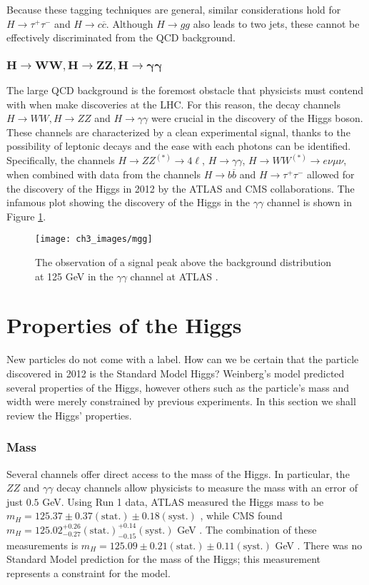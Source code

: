 \documentclass[10pt,a4paper]{book}
\begin{document}
Because these tagging techniques are general, similar considerations hold for $H \rightarrow \tau^+ \tau^-$ and $H \rightarrow c \overline{c}$. Although $H \rightarrow g g$ also leads to two jets, these cannot be effectively discriminated from the QCD background.

\subsubsection{$\mathbf{H\rightarrow WW, H\rightarrow ZZ, H\rightarrow \gamma\gamma}$}
The large QCD background is the foremost obstacle that physicists must contend with when make discoveries at the LHC. For this reason, the decay channels  
$H\rightarrow WW, H\rightarrow ZZ$ and $H\rightarrow \gamma\gamma$ were crucial in the discovery of the Higgs boson. These channels are characterized by a clean experimental signal, thanks to the possibility of leptonic decays and the ease with each photons can be identified. Specifically, the channels $H\rightarrow ZZ^{(*)}\rightarrow 4\ell$, $H\rightarrow\gamma\gamma$, $H\rightarrow WW^{(*)} \rightarrow e\nu\mu\nu$, when combined with data from the channels $H\rightarrow b\overline{b}$ and $H \rightarrow \tau^+ \tau^-$ allowed for the discovery of the Higgs in 2012 by the ATLAS and CMS collaborations. The infamous plot showing the discovery of the Higgs in the $\gamma\gamma$ channel is shown in Figure \ref{mgg}.

\begin{figure}
\centering
\texttt{[image: ch3\_images/mgg]}
\caption{The observation of a signal peak above the background distribution at 125 GeV in the $\gamma\gamma$ channel at ATLAS \cite{ATLAS:2012yve}.}
\label{mgg}
\end{figure}

\section{Properties of the Higgs}
New particles do not come with a label. How can we be certain that the particle discovered in 2012 is the Standard Model Higgs? Weinberg's model predicted several properties of the Higgs, however others such as the particle's mass and width were merely constrained by previous experiments. In this section we shall review the Higgs' properties.

\subsubsection{Mass}
Several channels offer direct access to the mass of the Higgs. In particular, the $ZZ$ and $\gamma\gamma$ decay channels allow physicists to measure the mass with an error of just $0.5$ GeV. Using Run 1 data, ATLAS measured the Higgs mass to be $m_H = 125.37 \pm 0.37(\text{stat.}) \pm 0.18(\text{syst.})$ \cite{ATLAS:2014euz}, while CMS found $m_H = 125.02^{+0.26}_{-0.27}(\text{stat.})^{+0.14}_{-0.15}(\text{syst.})$ GeV \cite{CMS:2014fzn}. The combination of these measurements is $m_H = 125.09 \pm 0.21(\text{stat.})\pm 0.11(\text{syst.})$ GeV \cite{ATLAS:2015yey}.  There was no Standard Model prediction for the mass of the Higgs; this measurement represents a constraint for the model.
\end{document}
